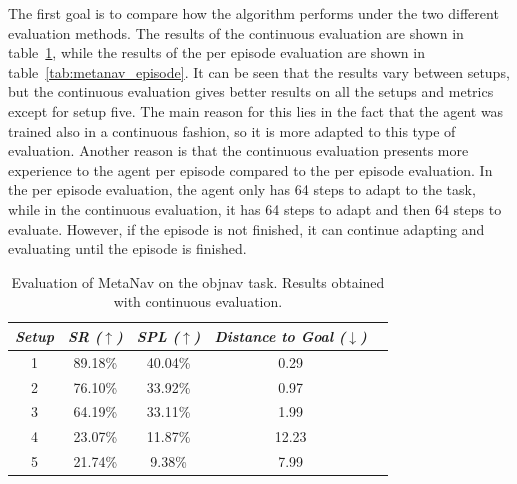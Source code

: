 The first goal is to compare how the algorithm performs under the two different evaluation methods.
The results of the continuous evaluation are shown in table~\ref{tab:metanav_continuos}, while the results of the per episode evaluation are shown in table~\ref{tab:metanav_episode}.
It can be seen that the results vary between setups, but the continuous evaluation gives better results on all the setups and metrics except for setup five.
The main reason for this lies in the fact that the agent was trained also in a continuous fashion, so it is more adapted to this type of evaluation.
Another reason is that the continuous evaluation presents more experience to the agent per episode compared to the per episode evaluation.
In the per episode evaluation, the agent only has 64 steps to adapt to the task, while in the continuous evaluation, it has 64 steps to adapt and then 64 steps to evaluate.
However, if the episode is not finished, it can continue adapting and evaluating until the episode is finished.

\begin{table}
    \centering
    \begin{tabular}{c|cccc}
        \toprule
        \textit{\textbf{Setup}} & \textit{\textbf{SR ($\uparrow$)}} & \textbf{\textit{SPL ($\uparrow$)}} & \textit{\textbf{Distance to Goal ($\downarrow$)}} \\ \midrule
        1                       & 89.18\%                           & 40.04\%                            & 0.29                                              \\
        2                       & 76.10\%                           & 33.92\%                            & 0.97                                              \\
        3                       & 64.19\%                           & 33.11\%                            & 1.99                                              \\
        4                       & 23.07\%                           & 11.87\%                            & 12.23                                             \\
        5                       & 21.74\%                           & 9.38\%                             & 7.99                                              \\
    \end{tabular}
    \caption{Evaluation of MetaNav on the \acrshort{objnav} task. Results obtained with continuous evaluation.}
    \label{tab:metanav_continuos}
\end{table}



